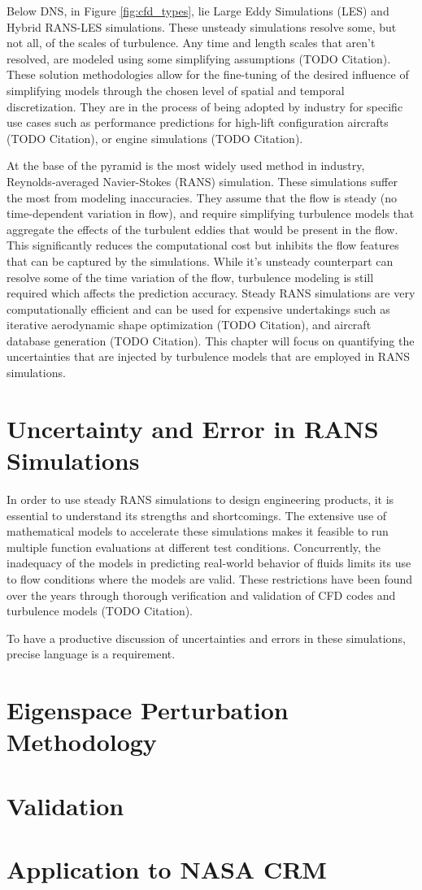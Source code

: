 Below DNS, in Figure \ref{fig:cfd_types}, lie Large Eddy Simulations (LES) and Hybrid RANS-LES simulations. These unsteady simulations resolve some, but not all, of the scales of turbulence. Any time and length scales that aren't resolved, are modeled using some simplifying assumptions (TODO Citation). These solution methodologies allow for the fine-tuning of the desired influence of simplifying models through the chosen level of spatial and temporal discretization. They are in the process of being adopted by industry for specific use cases such as performance predictions for high-lift configuration aircrafts (TODO Citation), or engine simulations (TODO Citation). 

At the base of the pyramid is the most widely used method in industry, Reynolds-averaged Navier-Stokes (RANS) simulation. These simulations suffer the most from modeling inaccuracies. They assume that the flow is steady (no time-dependent variation in flow), and require simplifying turbulence models that aggregate the effects of the turbulent eddies that would be present in the flow. This significantly reduces the computational cost but inhibits the flow features that can be captured by the simulations. While it's unsteady counterpart can resolve some of the time variation of the flow, turbulence modeling is still required which affects the prediction accuracy. Steady RANS simulations are very computationally efficient and can be used for expensive undertakings such as iterative aerodynamic shape optimization (TODO Citation), and aircraft database generation (TODO Citation). This chapter will focus on quantifying the uncertainties that are injected by turbulence models that are employed in RANS simulations. 

\section{Uncertainty and Error in RANS Simulations}

In order to use steady RANS simulations to design engineering products, it is essential to understand its strengths and shortcomings. The extensive use of mathematical models to accelerate these simulations makes it feasible to run multiple function evaluations at different test conditions. Concurrently, the inadequacy of the models in predicting real-world behavior of fluids limits its use to flow conditions where the models are valid. These restrictions have been found over the years through thorough verification and validation of CFD codes and turbulence models (TODO Citation). 

To have a productive discussion of uncertainties and errors in these simulations, precise language is a requirement. 

\section{Eigenspace Perturbation Methodology}

\section{Validation}

\section{Application to NASA CRM}
